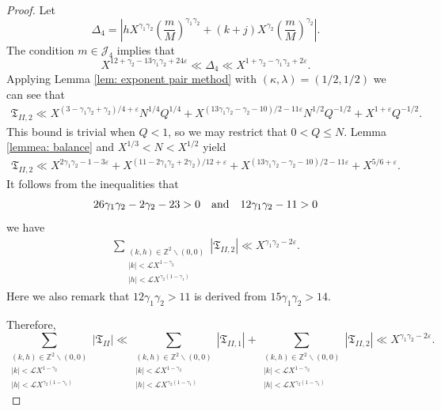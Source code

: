\documentclass[10pt,a4paper]{amsart}
\newcommand{\ZZ}{\ensuremath{\mathbb{Z}}}
\newcommand{\cL}{\ensuremath{\mathcal{L}}}
\begin{document}
\begin{proof}
	Let
	$$
	\Delta_4=\left|hX^{\gamma_1\gamma_2}
	\left(\frac{m}{M}\right)^{\gamma_1\gamma_2}
	+(k+j)X^{\gamma_2}\left(\frac{m}{M}\right)^{\gamma_2}\right|.
	$$
	The condition $m\in\mathcal{J}_4$ implies that
	$$
   X^{12+\gamma_2-13\gamma_1\gamma_2+24\varepsilon}\ll \Delta_4\ll
   X^{1+\gamma_2-\gamma_1\gamma_2+2\varepsilon}.
   $$
	Applying Lemma \ref{lem: exponent pair method} with $(\kappa,\lambda)=(1/2,1/2)$
	we can see that
	\begin{align*}
		\mathfrak{T}_{II,2}\ll X^{(3-\gamma_1\gamma_2+\gamma_2)/4+\varepsilon}N^{1/4}Q^{1/4}
		+X^{(13\gamma_1\gamma_2-\gamma_2-10)/2-11\varepsilon}N^{1/2}Q^{-1/2}
		+X^{1+\varepsilon}Q^{-1/2}.
	\end{align*}
	This bound is trivial when $Q<1$, so we may restrict that $0<Q\leqslant N$.
	Lemma \ref{lemmea: balance} and $X^{1/3}<N<X^{1/2}$ yield
    \begin{align*}
    \mathfrak{T}_{II,2}\ll
		X^{2\gamma_1\gamma_2-1-3\varepsilon}
       +X^{(11-2\gamma_1\gamma_2+2\gamma_2)/12+\varepsilon}
       +X^{(13\gamma_1\gamma_2-\gamma_2-10)/2-11\varepsilon}
       +X^{5/6+\varepsilon}.
    \end{align*}
    It follows from the inequalities that
    $$
    26\gamma_1\gamma_2-2\gamma_2-23>0\ \ \ \hbox{and}
    \ \ \ 12\gamma_1\gamma_2-11>0
    $$
    we have
	\begin{align*}
		\sum_{\substack{(k,h) \in \ZZ^2 \backslash (0,0) \\ |k|<\cL X^{1-\gamma_2} \\ |h|<\cL X^{\gamma_2(1-\gamma_1)}}}|\mathfrak{T}_{II,2}|
     \ll X^{\gamma_1\gamma_2-2\varepsilon}.
	\end{align*}
Here we also remark that $12\gamma_1\gamma_2>11$ is derived from $15\gamma_1\gamma_2>14$.

   Therefore,
   $$
   \sum_{\substack{(k,h) \in \ZZ^2 \backslash (0,0) \\ |k|<\cL X^{1-\gamma_2} \\ |h|<\cL X^{\gamma_2(1-\gamma_1)}}}|\mathfrak{T}_{II}|
   \ll \sum_{\substack{(k,h) \in \ZZ^2 \backslash (0,0) \\ |k|<\cL X^{1-\gamma_2} \\ |h|<\cL X^{\gamma_2(1-\gamma_1)}}}|\mathfrak{T}_{II,1}|
   +\sum_{\substack{(k,h) \in \ZZ^2 \backslash (0,0) \\ |k|<\cL X^{1-\gamma_2} \\ |h|<\cL X^{\gamma_2(1-\gamma_1)}}}|\mathfrak{T}_{II,2}|
     \ll X^{\gamma_1\gamma_2-2\varepsilon}.
   $$
\end{proof}
\end{document}

